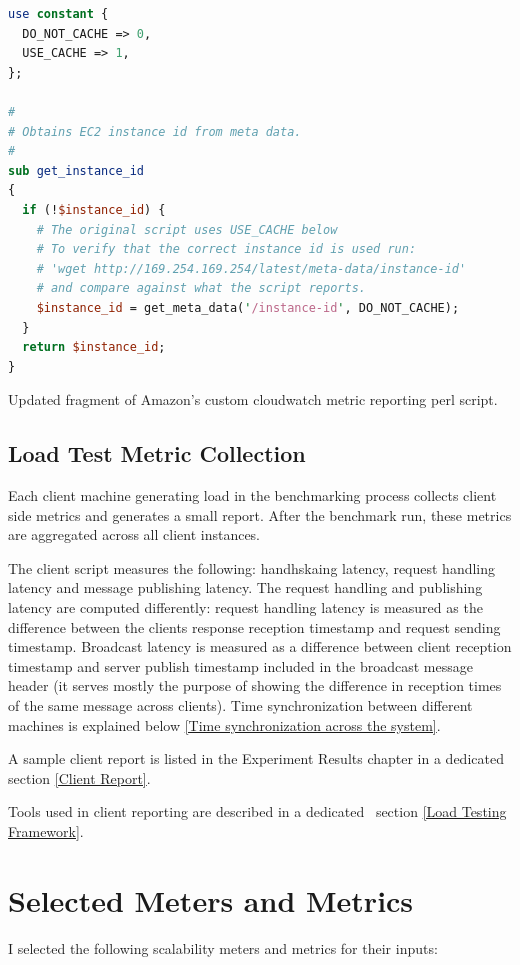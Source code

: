 \documentclass{uvamscse}
\begin{document}
\begin{sourcecode}
\begin{lstlisting}[style=mono, language=perl]
use constant {
  DO_NOT_CACHE => 0,
  USE_CACHE => 1,
};

#
# Obtains EC2 instance id from meta data.
#
sub get_instance_id
{
  if (!$instance_id) {
    # The original script uses USE_CACHE below
    # To verify that the correct instance id is used run:
    # 'wget http://169.254.169.254/latest/meta-data/instance-id'
    # and compare against what the script reports.
    $instance_id = get_meta_data('/instance-id', DO_NOT_CACHE);
  }
  return $instance_id;
}
\end{lstlisting}
\caption{Updated fragment of Amazon's custom cloudwatch metric reporting perl script.}
\label{lstlisting:perl}
\end{sourcecode}

\subsection{Load Test Metric Collection}

Each client machine generating load in the benchmarking process collects client side metrics and generates a small report. After the benchmark run, these metrics are aggregated across all client instances.

The client script measures the following: handhskaing latency, request handling latency and message publishing latency. The request handling and publishing latency are computed differently: request handling latency is measured as the difference between the clients response reception timestamp and request sending timestamp. Broadcast latency is measured as a difference between client reception timestamp and server publish timestamp included in the broadcast message header (it serves mostly the purpose of showing the difference in reception times of the same message across clients). Time synchronization between different machines is explained below \ref{Time synchronization across the system}.

A sample client report is listed in the Experiment Results chapter in a dedicated section \ref{Client Report}.

Tools used in client reporting are described in a dedicated  section \ref{Load Testing Framework}.

\section{Selected Meters and Metrics}\label{Selected Meters and Metrics}
I selected the following scalability meters and metrics for their inputs:
\end{document}

